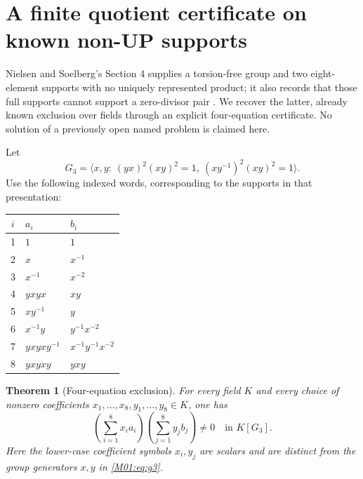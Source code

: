 \documentclass[11pt,a4paper,oneside]{report}
\newtheorem{theorem}{Theorem}[section]
\theoremstyle{definition}
\theoremstyle{remark}
\begin{document}
\section{A finite quotient certificate on known non-UP supports}\label{M01:sec:worked}

Nielsen and Soelberg's Section 4 supplies a torsion-free group and two
eight-element supports with no uniquely represented product; it also
records that those full supports cannot support a zero-divisor pair
\cite{B:NS}. We recover the latter, already known exclusion over fields
through an explicit four-equation certificate. No solution of a previously
open named problem is claimed here.

Let
\begin{equation}\label{M01:eq:g3}
G_3=\langle x,y:\ (yx)^2(xy)^2=1,\ (xy^{-1})^2(xy)^2=1\rangle.
\end{equation}
Use the following indexed words, corresponding to the supports in that
presentation:
\begin{center}
\small
\begin{tabular}{@{}cll@{}}
\toprule
$i$ & $a_i$ & $b_i$\\
\midrule
1 & $1$ & $1$\\
2 & $x$ & $x^{-1}$\\
3 & $x^{-1}$ & $x^{-2}$\\
4 & $yxyx$ & $xy$\\
5 & $xy^{-1}$ & $y$\\
6 & $x^{-1}y$ & $y^{-1}x^{-2}$\\
7 & $yxyxy^{-1}$ & $x^{-1}y^{-1}x^{-2}$\\
8 & $yxyxy$ & $yxy$\\
\bottomrule
\end{tabular}
\end{center}

\begin{theorem}[Four-equation exclusion]\label{M01:thm:nielsen}
For every field $K$ and every choice of nonzero coefficients
$x_1,\ldots,x_8,y_1,\ldots,y_8\in K$, one has
\[
\left(\sum_{i=1}^8 x_i a_i\right)
\left(\sum_{j=1}^8 y_j b_j\right)\ne0
\quad\text{in }K[G_3].
\]
Here the lower-case coefficient symbols $x_i,y_j$ are scalars and are
distinct from the group generators $x,y$ in \eqref{M01:eq:g3}.
\end{theorem}
\end{document}
